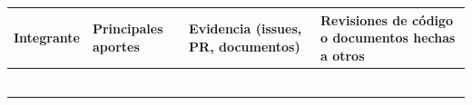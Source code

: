 {\def\LTcaptype{none} %
\begin{longtable}[]{@{}
  >{\raggedright\arraybackslash}p{}
  >{\raggedright\arraybackslash}p{}
  >{\raggedright\arraybackslash}p{}
  >{\raggedright\arraybackslash}p{}@{}}
\toprule\noalign{}
\begin{minipage}[b]{\linewidth}\raggedright
\textbf{Integrante}
\end{minipage} & \begin{minipage}[b]{\linewidth}\raggedright
\textbf{Principales aportes}
\end{minipage} & \begin{minipage}[b]{\linewidth}\raggedright
\textbf{Evidencia (issues, PR, documentos)}
\end{minipage} & \begin{minipage}[b]{\linewidth}\raggedright
\textbf{Revisiones de código o documentos hechas a otros}
\end{minipage} \\
\midrule\noalign{}
\endhead
\bottomrule\noalign{}
\endlastfoot
& & & \\
& & & \\
& & & \\
& & & \\
& & & \\
& & & \\
\end{longtable}
}
